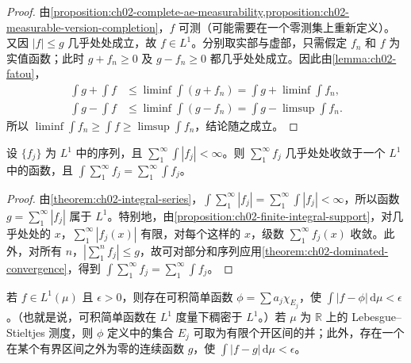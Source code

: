 \documentclass[../../main.tex]{subfiles}%
\begin{document}
\begin{proof}
由\cref{proposition:ch02-complete-ae-measurability,proposition:ch02-measurable-version-completion}，$f$ 可测（可能需要在一个零测集上重新定义）。又因 $|f|\le g$ 几乎处处成立，故 $f\in L^1$。分别取实部与虚部，只需假定 $f_n$ 和 $f$ 为实值函数；此时 $g+f_n\ge0$ 及 $g-f_n\ge0$ 都几乎处处成立。因此由\cref{lemma:ch02-fatou}，
\begin{align*}
\int g+\int f&\le\liminf\int(g+f_n)=\int g+\liminf\int f_n,\\
\int g-\int f&\le\liminf\int(g-f_n)=\int g-\limsup\int f_n.
\end{align*}
所以 $\liminf\int f_n\ge\int f\ge\limsup\int f_n$，结论随之成立。
\end{proof}
\begin{theorem}\label{theorem:ch02-absolutely-integrable-series}
设 $\{f_j\}$ 为 $L^1$ 中的序列，且 $\sum_1^\infty\int|f_j|<\infty$。则 $\sum_1^\infty f_j$ 几乎处处收敛于一个 $L^1$ 中的函数，且 $\int\sum_1^\infty f_j=\sum_1^\infty\int f_j$。
\end{theorem}
\begin{proof}
由\cref{theorem:ch02-integral-series}，$\int\sum_1^\infty|f_j|=\sum_1^\infty\int|f_j|<\infty$，所以函数 $g=\sum_1^\infty|f_j|$ 属于 $L^1$。特别地，由\cref{proposition:ch02-finite-integral-support}，对几乎处处的 $x$，$\sum_1^\infty|f_j(x)|$ 有限，对每个这样的 $x$，级数 $\sum_1^\infty f_j(x)$ 收敛。此外，对所有 $n$，$|\sum_1^n f_j|\le g$，故可对部分和序列应用\cref{theorem:ch02-dominated-convergence}，得到 $\int\sum_1^\infty f_j=\sum_1^\infty\int f_j$。
\end{proof}
\begin{theorem}\label{theorem:ch02-lone-density}
若 $f\in L^1(\mu)$ 且 $\epsilon>0$，则存在可积简单函数 $\phi=\sum a_j\chi_{E_j}$，使 $\int|f-\phi|\,\mathrm{d}\mu<\epsilon$。（也就是说，可积简单函数在 $L^1$ 度量下稠密于 $L^1$。）若 $\mu$ 为 $\mathbb{R}$ 上的 Lebesgue--Stieltjes 测度，则 $\phi$ 定义中的集合 $E_j$ 可取为有限个开区间的并；此外，存在一个在某个有界区间之外为零的连续函数 $g$，使 $\int|f-g|\,\mathrm{d}\mu<\epsilon$。
\end{theorem}
\end{document}
